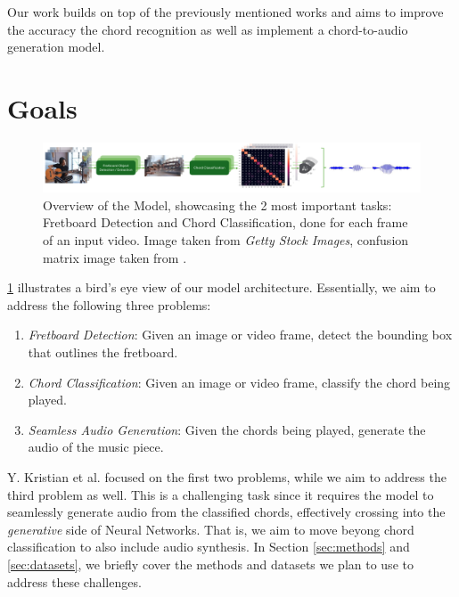 \documentclass[10pt,twocolumn,letterpaper]{article}
\begin{document}
Our work builds on top of the previously mentioned works \cite{Kristian_Zaman_Tenoyo_Jodhinata_2024}
\cite{du2023conditional} and aims to improve the accuracy the chord recognition as well as implement a chord-to-audio generation model.

\section{Goals}

\begin{figure}[h]
    \centering
    \includegraphics[width=\textwidth]{images/task-diagram.pdf}
    \caption{Overview of the Model, showcasing the 2 most important tasks:
        Fretboard Detection and Chord Classification, done for each frame of an input video. Image taken from \textit{Getty Stock Images}, confusion matrix image taken from \cite{Kristian_Zaman_Tenoyo_Jodhinata_2024}.}
    \label{fig:model-diagram}
\end{figure}

\cref{fig:model-diagram} illustrates a bird's eye view of our model architecture. Essentially, we aim to address the following three problems:
\begin{enumerate}[label=\arabic*), itemsep=0.25pt]
    \item \emph{Fretboard Detection}: Given an image or video frame, detect the bounding box that outlines the fretboard.
    \item \emph{Chord Classification}: Given an image or video frame, classify the chord being played.
    \item \emph{Seamless Audio Generation}: Given the chords being played, generate the audio of the music piece.
\end{enumerate}
Y. Kristian et al. \cite{Kristian_Zaman_Tenoyo_Jodhinata_2024} focused on the first two problems, while we aim to address the third problem as well. This is a challenging task since it requires the model to seamlessly generate audio from the classified chords, effectively crossing into the \emph{generative} side of Neural Networks. That is, we aim to move beyong chord classification to also include audio synthesis. In Section \cref{sec:methods} and \cref{sec:datasets}, we briefly cover the methods and datasets we plan to use to address these challenges.
\end{document}
